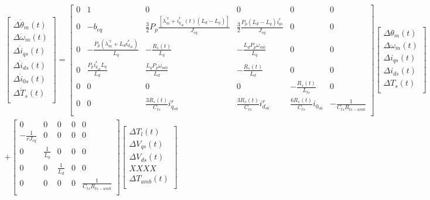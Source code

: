 \documentclass{article}
\begin{document}
\begin{multline}
    \begin{bmatrix}
        \Delta\dot{\theta}_{m}(t)\\
        \Delta\dot{\omega}_{m}(t)\\
        \Delta\dot{i}_{qs}(t)\\
        \Delta\dot{i}_{ds}(t)\\
        \Delta\dot{i}_{0s}(t)\\
        \Delta\dot{T}_{s}(t)\\
    \end{bmatrix} =
    \begin{bmatrix}
        0 & 1 & 0 & 0 & 0  & 0 \\
        0 & -b_{eq} & \frac{3}{2}P_{p}\frac{[\lambda_{m}^{\prime r} + i_{q_{s0}}^r(t)(L_{d}-L_{q})]}{J_{eq}} & \frac{3}{2}\frac{P_{p}(L_{d}-L_{q})i_{qs}^r}{J_{eq}} & 0 & 0\\
        0 & -\frac{P_{p}(\lambda_{m}^{\prime r} + L_{d}i_{d_{s0}}^r)}{L_{q}} & -\frac{R_{s}(t)}{L_{q}} & -\frac{L_{d}P_{p}\omega_{m0}}{L_{q}} & 0 & 0\\
        0 & \frac{P_{p}i_{q_{s0}}^r L_{q}}{L_{d}} & \frac{L_{q}P_{p}\omega_{m0}}{L_{d}} & -\frac{R_{s}(t)}{L_{d}} & 0 & 0\\
        0 & 0 & 0 & 0 & -\frac{R_{s}(t)}{L_{ls}} & 0\\
        0 & 0 & \frac{3R_{s}(t)}{C_{ts}}i_{q_{s0}}^r & \frac{3R_{s}(t)}{C_{ts}}i_{d_{s0}}^r & \frac{6R_{s}(t)}{C_{ts}}i_{0_{s0}} & -\frac{1}{C_{ts}R_{ts-amb}}\\
    \end{bmatrix}
    \begin{bmatrix}
        \Delta{\theta}_{m}(t)\\
        \Delta{\omega}_{m}(t)\\
        \Delta{i}_{qs}(t)\\
        \Delta{i}_{ds}(t)\\
        \Delta{T}_{s}(t)\\
    \end{bmatrix}\\  + 
    \begin{bmatrix}
        0 & 0 & 0 & 0 & 0\\
        -\frac{1}{rJ_{eq}} & 0 & 0 & 0 & 0\\
        0 & \frac{1}{L_{q}} & 0 & 0 & 0\\
        0 & 0 & \frac{1}{L_{d}} & 0 & 0\\
        0 & 0 & 0 & 0 & \frac{1}{C_{ts}R_{ts-amb}}\\
    \end{bmatrix}
    \begin{bmatrix}
        \Delta{T}_{l}(t)\\
        \Delta{V}_{qs}(t)\\
        \Delta{V}_{ds}(t)\\
        XXXX\\
        \Delta T_{amb}(t)\\
    \end{bmatrix} 
\end{multline}
\end{document}
